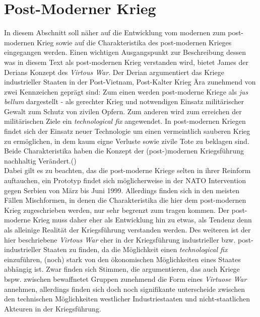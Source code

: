 \documentclass[11pt,a4paper,oneside,numbers=noenddot,bibliography=totocnumbered,DIV=13]{scrartcl}
\begin{document}
\section{Post-Moderner Krieg}
In diesem Abschnitt soll näher auf die Entwicklung vom modernen zum post-modernen Krieg sowie auf die Charakteristika des post-modernen Krieges   eingegangen werden. Einen wichtigen Ausgangspunkt zur Beschreibung dessen was in diesem Text als post-modernen Krieg verstanden wird, bietet James der Derians Konzept des \textit{Virtous War}. Der Derian argumentiert das Kriege industrieller Staaten in der Post-Vietnam, Post-Kalter Krieg Ära zunehmend von zwei Kennzeichen geprägt sind: Zum einen werden post-moderne Kriege als \textit{jus bellum} dargestellt - als gerechter Krieg und notwendigen Einsatz militärischer Gewalt zum Schutz von zivilen Opfern. Zum anderen wird zum erreichen der militärischen Ziele ein \textit{technological fix} angewendet. In post-modernen Kriegen findet sich der Einsatz neuer Technologie um einen vermeintlich sauberen Krieg zu ermöglichen, in dem kaum eigne Verluste sowie zivile Tote zu beklagen sind. Beide Charakteristika haben die Konzept der (post-)modernen Kriegsführung nachhaltig Verändert.(\cite{DerDerian2001}) \\
Dabei gilt es zu beachten, das die post-moderne Kriege selten in ihrer Reinform auftauchen, ein Prototyp findet sich möglicherweise in der NATO Intervention gegen Serbien von März bis Juni 1999. Allerdings finden sich in den meisten Fällen Mischformen, in denen die Charakteristika die hier dem post-modernen Krieg zugeschrieben werden, nur sehr begrenzt zum tragen kommen. Der post-moderne Krieg muss daher eher als Entwicklung hin zu etwas, als Tendenz denn als alleinige Realität der Kriegsführung verstanden werden. Des weiteren ist der hier beschriebene \textit{Virtous War} eher in der Kriegsführung industrieller bzw. post-industrieller Staaten zu finden, da die Möglichkeit einen \textit{technological fix} einzuführen, (noch) stark von den ökonomischen Möglichkeiten eines Staates abhängig ist. Zwar finden sich Stimmen, die argumentieren, das auch Kriege bspw. zwischen bewaffnetet Gruppen zunehmend die Form eines \textit{Virtuose War} annehmen, allerdings finden sich doch noch signifikante unterscheide zwischen den technischen Möglichkeiten westlicher Industriestaaten und nicht-staatlichen Akteuren in der Kriegsführung.\\ 
\end{document}
